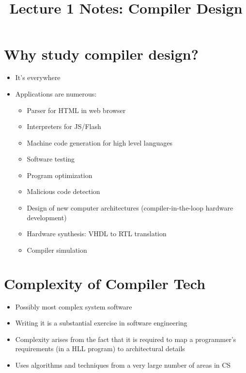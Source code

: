 \documentclass[a4paper,12pt]{article}
\title{\textbf{Lecture 1 Notes: Compiler Design}}
\author{}
\date{}
\begin{document}
\maketitle

\begin{small}
\tableofcontents
\end{small}%
\pagebreak

\section{Why study compiler design?}
\begin{itemize}[leftmargin=1.5em]
    \item It's everywhere
    \item Applications are numerous:
    \begin{itemize}
        \item Parser for HTML in web browser
        \item Interpreters for JS/Flash
        \item Machine code generation for high level languages
        \item Software testing
        \item Program optimization
        \item Malicious code detection
        \item Design of new computer architectures (compiler-in-the-loop hardware development)
        \item Hardware synthesis: VHDL to RTL translation
        \item Compiler simulation
    \end{itemize}
\end{itemize}

\section{Complexity of Compiler Tech}
\begin{itemize}[leftmargin=1.5em]
    \item Possibly most complex system software
    \item Writing it is a substantial exercise in software engineering
    \item Complexity arises from the fact that it is required to map a programmer's requirements (in a HLL program) to architectural details
    \item Uses algorithms and techniques from a very large number of areas in CS
\end{itemize}
\end{document}
